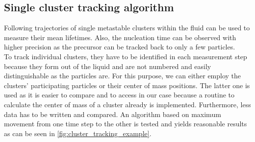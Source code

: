 \subsection{Single cluster tracking algorithm}
\label{sec:tracking}
Following trajectories of single metastable clusters within the fluid can be used to measure their mean lifetimes. Also, the nucleation time can be observed with higher precision as the precursor can be tracked back to only a few particles.\\ 
To track individual clusters, they have to be identified in each measurement step because they form out of the liquid and are not numbered and easily distinguishable as the particles are. For this purpose, we can either employ the clusters' participating particles or their center of mass positions. The latter one is used as it is easier to compare and to access in our case because a routine to calculate the center of mass of a cluster already is implemented. Furthermore, less data has to be written and compared. An algorithm based on maximum movement from one time step to the other is tested and yields reasonable results as can be seen in \autoref{fig:cluster_tracking_example}.\\

